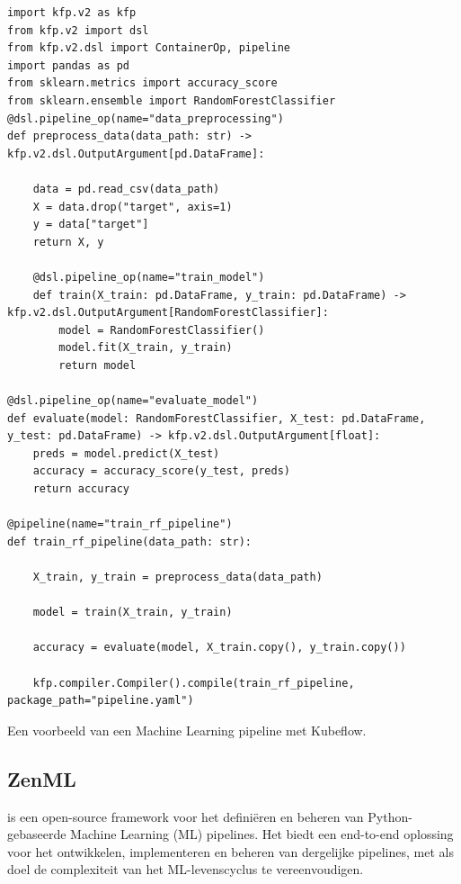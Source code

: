 \begin{listing}
\begin{verbatim}
import kfp.v2 as kfp
from kfp.v2 import dsl
from kfp.v2.dsl import ContainerOp, pipeline
import pandas as pd
from sklearn.metrics import accuracy_score
from sklearn.ensemble import RandomForestClassifier
@dsl.pipeline_op(name="data_preprocessing")
def preprocess_data(data_path: str) -> kfp.v2.dsl.OutputArgument[pd.DataFrame]:

    data = pd.read_csv(data_path)
    X = data.drop("target", axis=1)
    y = data["target"]
    return X, y

    @dsl.pipeline_op(name="train_model")
    def train(X_train: pd.DataFrame, y_train: pd.DataFrame) -> kfp.v2.dsl.OutputArgument[RandomForestClassifier]:
        model = RandomForestClassifier()
        model.fit(X_train, y_train)
        return model

@dsl.pipeline_op(name="evaluate_model")
def evaluate(model: RandomForestClassifier, X_test: pd.DataFrame, y_test: pd.DataFrame) -> kfp.v2.dsl.OutputArgument[float]:
    preds = model.predict(X_test)
    accuracy = accuracy_score(y_test, preds)
    return accuracy

@pipeline(name="train_rf_pipeline")
def train_rf_pipeline(data_path: str):

    X_train, y_train = preprocess_data(data_path)

    model = train(X_train, y_train)

    accuracy = evaluate(model, X_train.copy(), y_train.copy())

    kfp.compiler.Compiler().compile(train_rf_pipeline, package_path="pipeline.yaml")
\end{verbatim}
\caption[Voorbeeld van een Machine Learning pipeline met Kubeflow.]{\label{code:example-Kubeflow}Een voorbeeld van een Machine Learning pipeline met Kubeflow.}
\end{listing}

\subsection{ZenML}
\label{subsec:ZenML}
\textcite{ZenML2024} is een open-source framework voor het definiëren en beheren van Python-gebaseerde Machine Learning (ML) pipelines. Het biedt een end-to-end oplossing voor het ontwikkelen, implementeren en beheren van dergelijke pipelines, met als doel de complexiteit van het ML-levenscyclus te vereenvoudigen.

